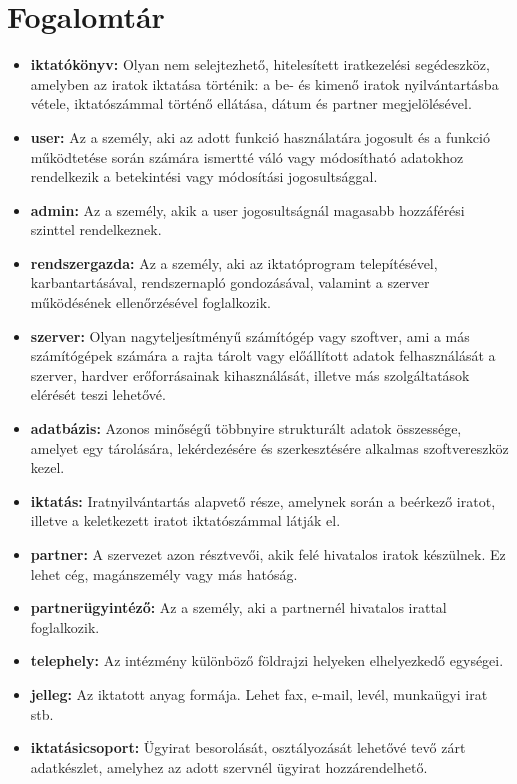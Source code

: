 \documentclass[
]{thesis-ekf}
\theoremstyle{definition}
\theoremstyle{remark}
\begin{document}
\section{Fogalomtár\cite{rendelet}}
\begin{itemize}[leftmargin=0pt]
 	\item[] \textbf{iktatókönyv:} Olyan nem selejtezhető, hitelesített iratkezelési segédeszköz, amelyben az iratok iktatása történik: a be- és kimenő iratok nyilvántartásba vétele, iktatószámmal történő ellátása, dátum és partner megjelölésével.
	\item[] \textbf{user:}  Az a személy, aki az adott funkció használatára jogosult és a funkció működtetése során számára ismertté váló vagy módosítható adatokhoz rendelkezik a betekintési vagy módosítási jogosultsággal.
	\item[] \textbf{admin:} Az a személy, akik a user jogosultságnál magasabb hozzáférési szinttel rendelkeznek.
	\item[] \textbf{rendszergazda:} Az a személy, aki az iktatóprogram telepítésével, karbantartásával, rendszernapló gondozásával, valamint a szerver működésének ellenőrzésével foglalkozik.
	\item[] \textbf{szerver: }Olyan nagyteljesítményű számítógép vagy szoftver, ami a más számítógépek számára a rajta tárolt vagy előállított adatok felhasználását a szerver, hardver erőforrásainak kihasználását, illetve más szolgáltatások elérését teszi lehetővé.
	\item[] \textbf{adatbázis: }Azonos minőségű többnyire strukturált adatok összessége, amelyet egy tárolására, lekérdezésére és szerkesztésére alkalmas szoftvereszköz kezel.
	\item[] \textbf{iktatás: }Iratnyilvántartás alapvető része, amelynek során a beérkező iratot, illetve a keletkezett iratot iktatószámmal látják el.
	\item[] \textbf{partner: }A szervezet azon résztvevői, akik felé hivatalos iratok készülnek. Ez lehet cég, magánszemély vagy más hatóság.
	\item[] \textbf{partnerügyintéző: }Az a személy, aki a partnernél hivatalos irattal foglalkozik.
	\item[] \textbf{telephely: }Az intézmény különböző földrajzi helyeken elhelyezkedő egységei.
	\item[] \textbf{jelleg: }Az iktatott anyag formája. Lehet fax, e-mail, levél, munkaügyi irat stb.
	\item[] \textbf{iktatásicsoport: }Ügyirat besorolását, osztályozását lehetővé tevő zárt adatkészlet, amelyhez az adott szervnél ügyirat hozzárendelhető.

\end{itemize}
\end{document}
